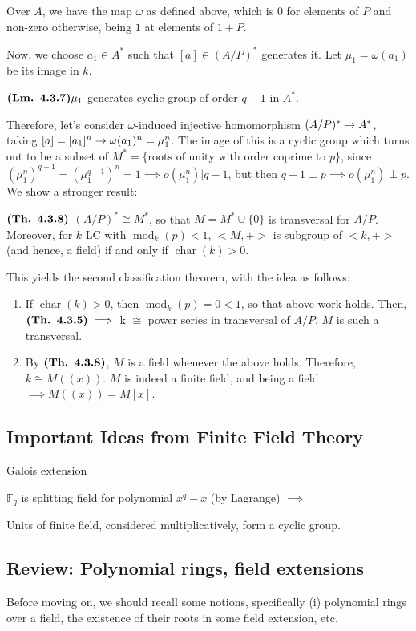 \documentclass{article}
\DeclareMathOperator{\modl}{mod}
\DeclareMathOperator{\chars}{char}
\begin{document}
Over $A$, we have the map $\omega$ as defined above, which is $0$ for elements of $P$ and non-zero otherwise, being $1$ at elements of $1+P$.

Now, we choose $a_1 \in A^*$ such that $[a] \in (A/P)^*$ generates it. Let $\mu_1 = \omega(a_1)$ be its image in $k$.

$\textbf{(Lm. 4.3.7)} \mu_1$ generates cyclic group of order $q-1$ in $A^*$.

Therefore, let's consider $\omega$-induced injective homomorphism $(A/P)^* \rightarrow A^*$, taking $[a] = [a_1]^n \rightarrow \omega(a_1)^n = \mu_1^n$. The image of this is a cyclic group which turns out to be a subset of $M^* = \{\text{roots of unity with order coprime to }p \}$, since $(\mu_1^n)^{q-1} = (\mu_1^{q-1})^{n} = 1 \implies o(\mu_1^n)|q-1$, but then $q-1 \perp p \implies o(\mu_1^n) \perp p$. We show a stronger result:

$\textbf{(Th. 4.3.8)}$ $(A/P)^* \cong M^*$, so that $M = M^* \cup \{0\}$ is transversal for $A/P$. Moreover, for $k$ LC with $\modl_k(p) < 1$, $<M,+>$ is subgroup of $<k,+>$ (and hence, a field) if and only if $\chars(k) > 0$.

This yields the second classification theorem, with the idea as follows:
\begin{enumerate}
    \item If $\chars(k) > 0$, then $\modl_k(p) = 0 < 1$, so that above work holds. Then, $\textbf{(Th. 4.3.5)} \implies$ k $\cong$ power series in transversal of $A/P$. $M$ is such a transversal.
    \item By $\textbf{(Th. 4.3.8)}$, $M$ is a field whenever the above holds. Therefore, $k \cong M((x))$. $M$ is indeed a finite field, and being a field $\implies M((x)) = M[x]$.
\end{enumerate}

\vspace{15 cm}

\subsection{Important Ideas from Finite Field Theory}
Galois extension

$\mathbb{F}_q$ is splitting field for polynomial $x^q - x$ (by Lagrange) $\implies$

Units of finite field, considered multiplicatively, form a cyclic group.

\subsection{Review: Polynomial rings, field extensions}
Before moving on, we should recall some notions, specifically (i) polynomial rings over a field, the existence of their roots in some field extension, etc.
\end{document}
